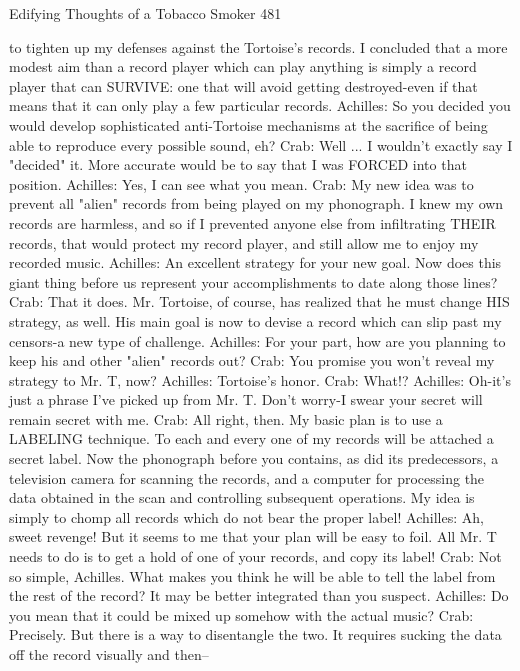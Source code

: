 {Edifying Thoughts of a Tobacco Smoker                                                    481

  to tighten up my defenses against the Tortoise's records. I concluded that a more
  modest aim than a record player which can play anything is simply a record player that
  can SURVIVE: one that will avoid getting destroyed-even if that means that it can
  only play a few particular records.
Achilles: So you decided you would develop sophisticated anti-Tortoise mechanisms at
  the sacrifice of being able to reproduce every possible sound, eh?
Crab: Well ... I wouldn't exactly say I "decided" it. More accurate would be to say that I
  was FORCED into that position.
Achilles: Yes, I can see what you mean.
Crab: My new idea was to prevent all "alien" records from being played on my
  phonograph. I knew my own records are harmless, and so if I prevented anyone else
  from infiltrating THEIR records, that would protect my record player, and still allow
  me to enjoy my recorded music.
Achilles: An excellent strategy for your new goal. Now does this giant thing before us
  represent your accomplishments to date along those lines?
Crab: That it does. Mr. Tortoise, of course, has realized that he must change HIS strategy,
  as well. His main goal is now to devise a record which can slip past my censors-a new
  type of challenge.
Achilles: For your part, how are you planning to keep his and other "alien" records out?
Crab: You promise you won't reveal my strategy to Mr. T, now?
Achilles: Tortoise's honor.
Crab: What!?
Achilles: Oh-it's just a phrase I've picked up from Mr. T. Don't worry-I swear your secret
  will remain secret with me.
Crab: All right, then. My basic plan is to use a LABELING technique. To each and every
  one of my records will be attached a secret label. Now the phonograph before you
  contains, as did its predecessors, a television camera for scanning the records, and a
  computer for processing the data obtained in the scan and controlling subsequent
  operations. My idea is simply to chomp all records which do not bear the proper label!
Achilles: Ah, sweet revenge! But it seems to me that your plan will be easy to foil. All
  Mr. T needs to do is to get a hold of one of your records, and copy its label!
Crab: Not so simple, Achilles. What makes you think he will be able to tell the label from
  the rest of the record? It may be better integrated than you suspect.
Achilles: Do you mean that it could be mixed up somehow with the actual music?
Crab: Precisely. But there is a way to disentangle the two. It requires sucking the data off
  the record visually and then--




}
